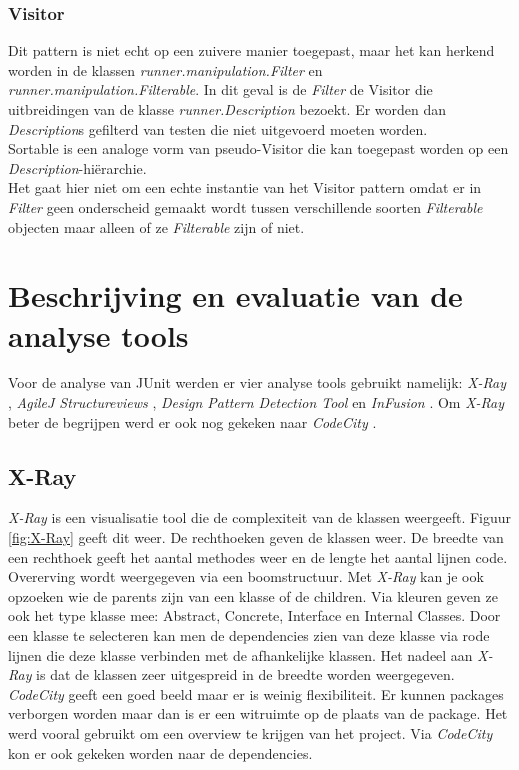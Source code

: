 \documentclass[i1]{oss}
\begin{document}
\subsubsection{Visitor}
Dit pattern is niet echt op een zuivere manier toegepast, maar het kan herkend worden in de klassen \emph{runner.manipulation.Filter} en \emph{runner.manipulation.Filterable}. 
In dit geval is de \emph{Filter} de Visitor die uitbreidingen van de klasse \emph{runner.Description} bezoekt. 
Er worden dan \emph{Description}s gefilterd van testen die niet uitgevoerd moeten worden. 
\\
Sortable is een analoge vorm van pseudo-Visitor die kan toegepast worden op een \emph{Description}-hi\"erarchie.
\\
Het gaat hier niet om een echte instantie van het Visitor pattern omdat er in \emph{Filter} geen onderscheid gemaakt wordt tussen verschillende soorten \emph{Filterable} objecten maar alleen of ze \emph{Filterable} zijn of niet.



%
%

\section{Beschrijving en evaluatie van de analyse tools}

Voor de analyse van JUnit werden er vier analyse tools gebruikt namelijk: \emph{X-Ray} \cite{X-Ray}, \emph{AgileJ Structureviews} \cite{AgileJ Structureviews} , \emph{Design Pattern Detection Tool} \cite{Design Pattern Detection Tool} en \emph{InFusion} \cite{Infusion}. Om \emph{X-Ray} beter de begrijpen werd er ook nog gekeken naar \emph{CodeCity} \cite{CodeCity}.


\subsection{X-Ray} 
\emph{X-Ray} is een visualisatie tool die de complexiteit van de klassen weergeeft. Figuur \ref{fig:X-Ray} geeft dit weer. De rechthoeken geven de klassen weer. De breedte van een rechthoek geeft het aantal methodes weer en de lengte het aantal lijnen code. Overerving wordt weergegeven via een boomstructuur. Met \emph{X-Ray} kan je ook opzoeken wie de parents zijn van een klasse of de children. Via kleuren geven ze ook het type klasse mee: Abstract, Concrete, Interface en Internal Classes. Door een klasse te selecteren kan men de dependencies zien van deze klasse via rode lijnen die deze klasse verbinden met de afhankelijke klassen. Het nadeel aan \emph{X-Ray} is dat de klassen zeer uitgespreid in de breedte worden weergegeven. \\
\emph{CodeCity} geeft een goed beeld maar er is weinig flexibiliteit. Er kunnen packages verborgen worden maar dan is er een witruimte op de plaats van de package. Het werd vooral gebruikt om een overview te krijgen van het project. Via \emph{CodeCity} kon er ook gekeken worden naar de dependencies. 
\end{document}
